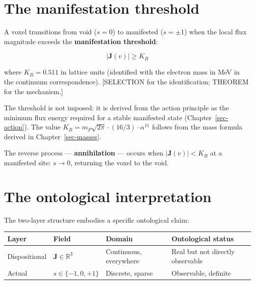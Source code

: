 \documentclass[
  11pt,
  letterpaper,
  twoside,
  openany]{book}
\makeatletter
\let\orig@section\section
\renewcommand{\section}{\needspace{8\baselineskip}\orig@section}
\makeatother
\begin{document}
\section{The manifestation threshold}\label{sec-threshold}

A voxel transitions from void (\(s = 0\)) to manifested (\(s = \pm 1\))
when the local flux magnitude exceeds the \textbf{manifestation
threshold}:

\[
|\mathbf{J}(v)| \geq K_B
\tag{2.2}
\]

where \(K_B = 0.511\) in lattice units (identified with the electron
mass in MeV in the continuum correspondence). {[}SELECTION for the
identification; THEOREM for the mechanism.{]}

The threshold is not imposed: it is derived from the action principle as
the minimum flux energy required for a stable manifested state
(Chapter~\ref{sec-action}). The value
\(K_B = m_P \sqrt{2\pi} \cdot (16/3) \cdot \alpha^{11}\) follows from
the mass formula derived in Chapter~\ref{sec-masses}.

The reverse process --- \textbf{annihilation} --- occurs when
\(|\mathbf{J}(v)| < K_B\) at a manifested site: \(s \to 0\), returning
the voxel to the void.

\section{The ontological
interpretation}\label{the-ontological-interpretation}

The two-layer structure embodies a specific ontological claim:

\begin{longtable}[]{@{}
  >{\raggedright\arraybackslash}p{}
  >{\raggedright\arraybackslash}p{}
  >{\raggedright\arraybackslash}p{}
  >{\raggedright\arraybackslash}p{}@{}}
\toprule\noalign{}
\begin{minipage}[b]{\linewidth}\raggedright
Layer
\end{minipage} & \begin{minipage}[b]{\linewidth}\raggedright
Field
\end{minipage} & \begin{minipage}[b]{\linewidth}\raggedright
Domain
\end{minipage} & \begin{minipage}[b]{\linewidth}\raggedright
Ontological status
\end{minipage} \\
\midrule\noalign{}
\endhead
\bottomrule\noalign{}
\endlastfoot
Dispositional & \(\mathbf{J} \in \mathbb{R}^3\) & Continuous, everywhere
& Real but not directly observable \\
Actual & \(s \in \{-1, 0, +1\}\) & Discrete, sparse & Observable,
definite \\
\end{longtable}
\end{document}
